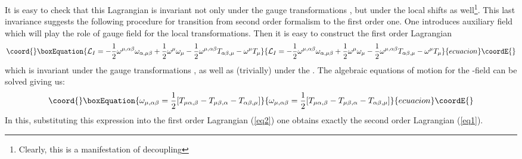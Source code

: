 \documentclass[a4paper,12pt]{article}
\begin{document}
It is easy to check that this Lagrangian is invariant not only under
the gauge transformations \coordHE{},
but under the local shifts \coordHE{} as well\footnote{Clearly, this is a manifestation of
\coordHE{} decoupling}. This last invariance suggests the following
procedure for transition from second order formalism to the first
order one. One introduces auxiliary field \myHighlight{$\omega_{\mu,[\alpha\beta]}$}\coordHE{}
which will play the role of gauge field for the local \myHighlight{$\eta_{\mu\nu}$}\coordHE{}
transformations. Then it is easy to construct the first order
Lagrangian
\begin{equation}\coord{}\boxEquation{
{\cal L}_I = - \frac{1}{2} \omega^{\mu,\alpha\beta}
\omega_{\alpha,\mu\beta} + \frac{1}{2} \omega^\mu \omega_\mu -
\frac{1}{2} \omega^{\mu,\alpha\beta} T_{\alpha\beta,\mu} - \omega^\mu
T_\mu \label{eq2}
}{
{\cal L}_I = - \frac{1}{2} \omega^{\mu,\alpha\beta}
\omega_{\alpha,\mu\beta} + \frac{1}{2} \omega^\mu \omega_\mu -
\frac{1}{2} \omega^{\mu,\alpha\beta} T_{\alpha\beta,\mu} - \omega^\mu
T_\mu }{ecuacion}\coordE{}\end{equation}
which is invariant under the gauge transformations
\myHighlight{$\delta \omega_{\mu,\alpha\beta} = \partial_\mu \eta_{\alpha\beta}$}\coordHE{},
\coordHE{} as well as (trivially) under the
\coordHE{}. The algebraic equations of
motion for the \myHighlight{$\omega$}\coordHE{}-field can be solved giving us:
\begin{equation}\coord{}\boxEquation{
\omega_{\mu,\alpha\beta} = \frac{1}{2} [ T_{\mu\alpha,\beta} -
T_{\mu\beta,\alpha} - T_{\alpha\beta,\mu} ]
}{
\omega_{\mu,\alpha\beta} = \frac{1}{2} [ T_{\mu\alpha,\beta} -
T_{\mu\beta,\alpha} - T_{\alpha\beta,\mu} ]
}{ecuacion}\coordE{}\end{equation}
In this, substituting this expression into the first order Lagrangian
(\ref{eq2}) one obtains exactly the second order Lagrangian
(\ref{eq1}).
\end{document}
